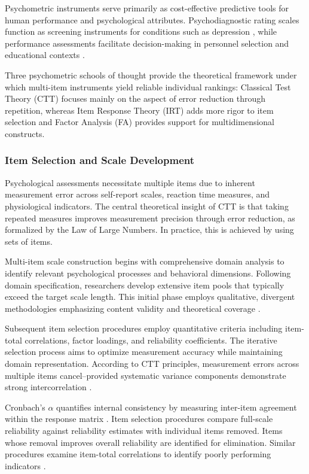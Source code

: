 \documentclass[
  authoryear,
  review]{elsarticle}
\begin{document}
Psychometric instruments serve primarily as cost-effective predictive
tools for human performance and psychological attributes.
Psychodiagnostic rating scales function as screening instruments for
conditions such as depression \citep{Kroenke2001}, while performance
assessments facilitate decision-making in personnel selection and
educational contexts \citep{Schmidt1998}.

Three psychometric schools of thought provide the theoretical framework
under which multi-item instruments yield reliable individual rankings:
Classical Test Theory (CTT) focuses mainly on the aspect of error
reduction through repetition, whereas Item Response Theory (IRT) adds
more rigor to item selection and Factor Analysis (FA) provides support
for multidimensional constructs.

\subsubsection{Item Selection and Scale
Development}\label{item-selection-and-scale-development}

Psychological assessments necessitate multiple items due to inherent
measurement error across self-report scales, reaction time measures, and
physiological indicators. The central theoretical insight of CTT is that
taking repeated measures improves measurement precision through error
reduction, as formalized by the Law of Large Numbers. In practice, this
is achieved by using sets of items.

Multi-item scale construction begins with comprehensive domain analysis
to identify relevant psychological processes and behavioral dimensions.
Following domain specification, researchers develop extensive item pools
that typically exceed the target scale length. This initial phase
employs qualitative, divergent methodologies emphasizing content
validity and theoretical coverage \citep{Hinkin1998}.

Subsequent item selection procedures employ quantitative criteria
including item-total correlations, factor loadings, and reliability
coefficients. The iterative selection process aims to optimize
measurement accuracy while maintaining domain representation. According
to CTT principles, measurement errors across multiple items
cancel--provided systematic variance components demonstrate strong
intercorrelation \citep{Cronbach1951}.

Cronbach's \(\alpha\) quantifies internal consistency by measuring
inter-item agreement within the response matrix \citep{Cronbach1951}.
Item selection procedures compare full-scale reliability against
reliability estimates with individual items removed. Items whose removal
improves overall reliability are identified for elimination. Similar
procedures examine item-total correlations to identify poorly performing
indicators \citep{Clark1995}.
\end{document}
